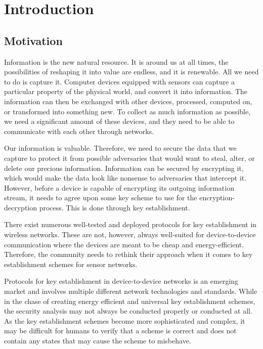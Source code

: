 \chapter{Introduction}
\label{chp:introduction} 


\section{Motivation}


Information is the new natural resource. It is around us at all times, the possibilities of reshaping it into value are endless, and it is renewable. All we need to do is capture it. Computer devices equipped with sensors can capture a particular property of the physical world, and convert it into information. The information can then be exchanged with other devices, processed, computed on, or transformed into something new. To collect as much information as possible, we need a significant amount of these devices, and they need to be able to communicate with each other through networks. 

Our information is valuable. Therefore, we need to secure the data that we capture to protect it from possible adversaries that would want to steal, alter, or delete our precious information. Information can be secured by encrypting it, which would make the data look like nonsense to adversaries that intercept it. However, before a device is capable of encrypting its outgoing information stream, it needs to agree upon some key scheme to use for the encryption-decryption process. This is done through key establishment. 

There exist numerous well-tested and deployed protocols for key establishment in wireless networks. These are not, however, always well-suited for device-to-device communication where the devices are meant to be cheap and energy-efficient. Therefore, the community needs to rethink their approach when it comes to key establishment schemes for sensor networks.

Protocols for key establishment in device-to-device networks is an emerging market and involves multiple different network technologies and standards. While in the chase of creating energy efficient and universal key establishment schemes, the security analysis may not always be conducted properly or conducted at all. As the key establishment schemes become more sophisticated and complex, it may be difficult for humans to verify that a scheme is correct and does not contain any states that may cause the scheme to misbehave.

